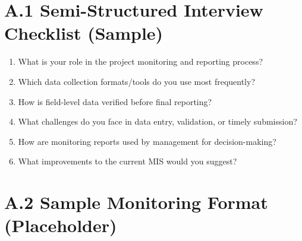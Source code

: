 \documentclass[12pt,a4paper]{report}
\begin{document}
\section*{A.1 Semi-Structured Interview Checklist (Sample)}
\begin{enumerate}
    \item What is your role in the project monitoring and reporting process?
    \item Which data collection formats/tools do you use most frequently?
    \item How is field-level data verified before final reporting?
    \item What challenges do you face in data entry, validation, or timely submission?
    \item How are monitoring reports used by management for decision-making?
    \item What improvements to the current MIS would you suggest?
\end{enumerate}

\section*{A.2 Sample Monitoring Format (Placeholder)}
\begin{center}
\end{center}
\end{document}
